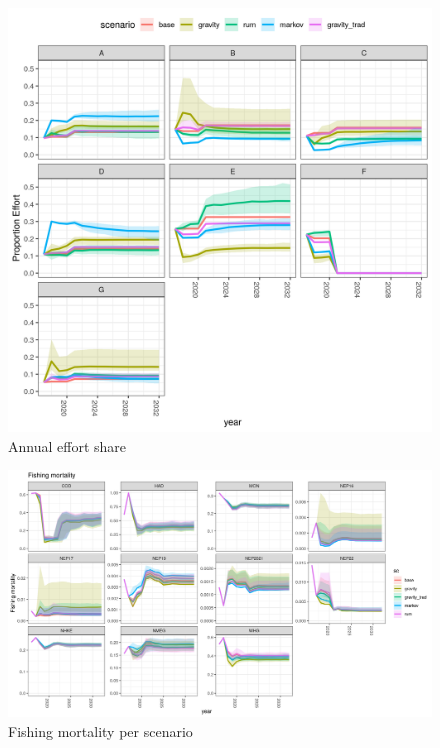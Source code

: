 \documentclass[12pt, halfline, a4paper]{ouparticle}
\begin{document}
\newpage

\begin{figure}[!ht]
	\centering
	\includegraphics[width=1\linewidth]{figures/Effort_shares_annual}
	\caption{Annual effort share} 
	\label{fig:effort_an}
\end{figure}	

\begin{figure}[!ht]
	\centering
	\includegraphics[width=1\linewidth]{figures/F_difference}
	\caption{Fishing mortality per scenario} 
	\label{fig:F}
\end{figure}	
\end{document}
